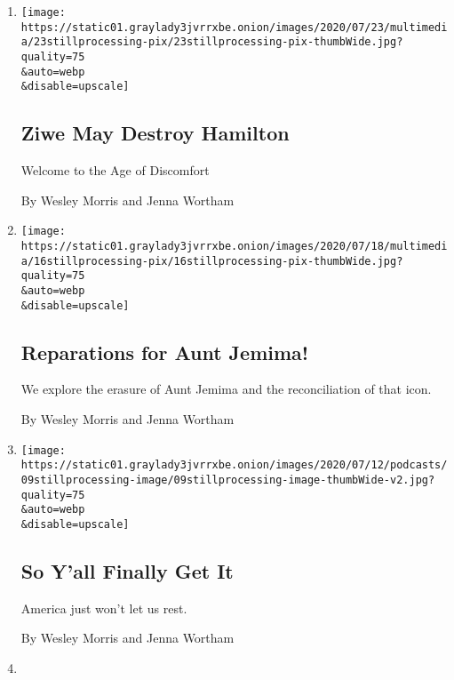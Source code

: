 \begin{enumerate}
\def\labelenumi{\arabic{enumi}.}
\item
  \href{/2020/07/23/podcasts/hamilton-ziwe-discomfort.html}{}

  \texttt{[image: https://static01.graylady3jvrrxbe.onion/images/2020/07/23/multimedia/23stillprocessing-pix/23stillprocessing-pix-thumbWide.jpg?quality=75\\\&auto=webp\\\&disable=upscale]}

  \hypertarget{ziwe-may-destroy-hamilton}{%
  \subsection{Ziwe May Destroy
  Hamilton}\label{ziwe-may-destroy-hamilton}}

  Welcome to the Age of Discomfort

  By Wesley Morris and Jenna Wortham
\item
  \href{/2020/07/16/podcasts/reparations-for-aunt-jemima.html}{}

  \texttt{[image: https://static01.graylady3jvrrxbe.onion/images/2020/07/18/multimedia/16stillprocessing-pix/16stillprocessing-pix-thumbWide.jpg?quality=75\\\&auto=webp\\\&disable=upscale]}

  \hypertarget{reparations-for-aunt-jemima}{%
  \subsection{Reparations for Aunt
  Jemima!}\label{reparations-for-aunt-jemima}}

  We explore the erasure of Aunt Jemima and the reconciliation of that
  icon.

  By Wesley Morris and Jenna Wortham
\item
  \href{/2020/07/09/podcasts/still-processing-black-lives-matter.html}{}

  \texttt{[image: https://static01.graylady3jvrrxbe.onion/images/2020/07/12/podcasts/09stillprocessing-image/09stillprocessing-image-thumbWide-v2.jpg?quality=75\\\&auto=webp\\\&disable=upscale]}

  \hypertarget{so-yall-finally-get-it}{%
  \subsection{So Y'all Finally Get It}\label{so-yall-finally-get-it}}

  America just won't let us rest.

  By Wesley Morris and Jenna Wortham
\item
  \href{/2020/05/14/podcasts/still-processing-westworld-hollywood-utopia-dystopia.html}{}


\end{enumerate}
